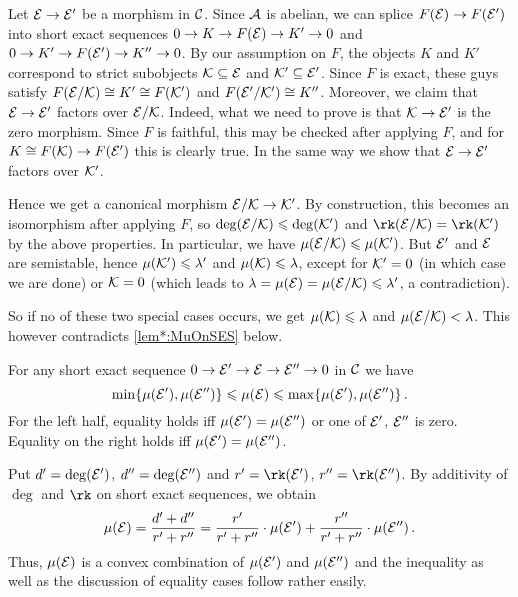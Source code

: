 \documentclass[a4paper, 10pt, oneside, DIV=9, chapterprefix=true, numbers=enddot,bibliography=totoc]{scrbook}
\begin{document}
\begin{proof*}
	Let $\Ee\morphism \Ee'$ be a morphism in $\mathcal{C}$. Since $\mathcal{A}$ is abelian, we can splice $F(\Ee)\morphism F(\Ee')$ into short exact sequences $0\morphism K\morphism F(\Ee)\morphism K'\morphism 0$ and $0\morphism K'\morphism F(\Ee')\morphism K''\morphism 0$. By our assumption on $F$, the objects $K$ and $K'$ correspond to strict subobjects $\mathcal{K}\subseteq \mathcal{E}$ and $\mathcal{K}'\subseteq \mathcal{E}'$. Since $F$ is exact, these guys satisfy $F(\mathcal{E}/\mathcal{K})\cong K'\cong F(\mathcal{K}')$ and $F(\mathcal{E}'/\mathcal{K}')\cong K''$. Moreover, we claim that $\Ee\morphism \Ee'$ factors over $\mathcal{E}/\mathcal{K}$. Indeed, what we need to prove is that $\Kk\morphism\Ee'$ is the zero morphism. Since $F$ is faithful, this may be checked after applying $F$, and for $K\cong F(\Kk)\morphism F(\Ee')$ this is clearly true. In the same way we show that $\Ee\morphism \Ee'$ factors over $\mathcal{K}'$.
	
	Hence we get a canonical morphism $\Ee/\Kk\morphism \Kk'$. By construction, this becomes an isomorphism after applying $F$, so $\deg(\mathcal{E}/\mathcal{K})\leqslant \deg(\mathcal{K}')$ and $\rk (\Ee/\Kk)=\rk (\Kk')$ by the above properties. In particular, we have $\mu(\mathcal{E}/\mathcal{K})\leqslant \mu(\mathcal{K}')$. But $\mathcal{E}'$ and $\mathcal{E}$ are semistable, hence $\mu(\mathcal{K}')\leqslant \lambda'$ and $\mu(\mathcal{K})\leqslant \lambda$, except for $\mathcal{K}'=0$ (in which case we are done) or $\mathcal{K}=0$ (which leads to $\lambda=\mu(\mathcal{E})=\mu(\mathcal{E}/\mathcal{K})\leqslant \lambda'$, a contradiction).
	
	So if no of these two special cases occurs, we get $\mu(\mathcal{K})\leqslant \lambda$ and $\mu(\mathcal{E}/\mathcal{K})<\lambda$. This however contradicts \cref{lem*:MuOnSES} below.
\end{proof*}
\begin{lem*}\label{lem*:MuOnSES}
	For any short exact sequence $0\morphism \Ee'\morphism \Ee\morphism \Ee''\morphism 0$ in $\mathcal{C}$ we have 
	\begin{equation*}
		\min\{\mu(\mathcal{E}'),\mu(\mathcal{E}'')\}\leqslant \mu(\mathcal{E})\leqslant \max\{\mu(\mathcal{E}'),\mu(\mathcal{E}'')\}\,.
	\end{equation*}
	For the left half, equality holds iff $\mu(\mathcal{E}')=\mu(\mathcal{E}'')$ or one of $\mathcal{E}'$, $\mathcal{E}''$ is zero. Equality on the right holds iff $\mu(\mathcal{E}')=\mu(\mathcal{E}'')$.
\end{lem*}
\begin{proof*}
	Put $d'=\deg(\mathcal{E}')$, $d''=\deg(\mathcal{E}'')$ and $r'=\rk(\Ee')$, $r''=\rk(\Ee'')$. By additivity of $\deg$ and $\rk$ on short exact sequences, we obtain
	\begin{equation*}
		\mu(\mathcal{E})=\frac{d'+d''}{r'+r''}=\frac{r'}{r'+r''}\cdot\mu(\mathcal{E}')+\frac{r''}{r'+r''}\cdot\mu(\mathcal{E}'')\,.
	\end{equation*}
	Thus, $\mu(\mathcal{E})$ is a convex combination of $\mu(\mathcal{E}')$ and $\mu(\mathcal{E}'')$ and the inequality as well as the discussion of equality cases follow rather easily.
\end{proof*}
\end{document}
